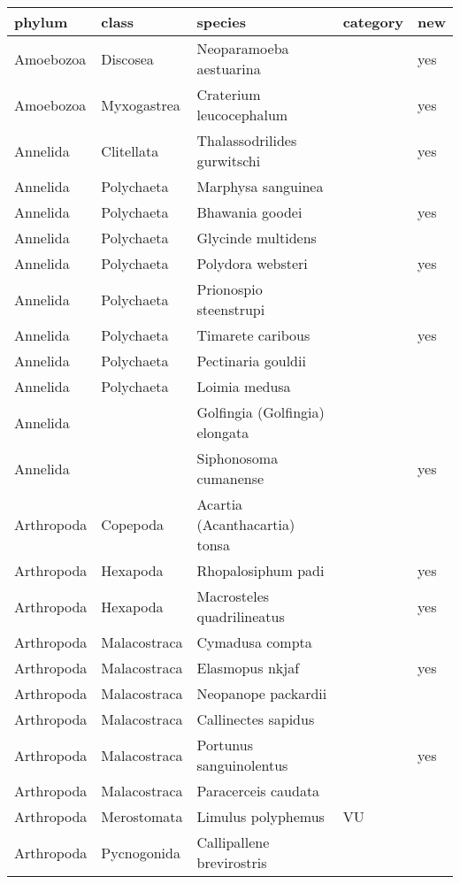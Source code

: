 \begingroup\fontsize{9pt}{10pt}\selectfont
\begin{longtable}{lllll}
  \hline
phylum & class & species & category & new \\ 
  \hline
Amoebozoa & Discosea & Neoparamoeba aestuarina &  & yes \\ 
  Amoebozoa & Myxogastrea & Craterium leucocephalum &  & yes \\ 
  Annelida & Clitellata & Thalassodrilides gurwitschi &  & yes \\ 
  Annelida & Polychaeta & Marphysa sanguinea &  &  \\ 
  Annelida & Polychaeta & Bhawania goodei &  & yes \\ 
  Annelida & Polychaeta & Glycinde multidens &  &  \\ 
  Annelida & Polychaeta & Polydora websteri &  & yes \\ 
  Annelida & Polychaeta & Prionospio steenstrupi &  &  \\ 
  Annelida & Polychaeta & Timarete caribous &  & yes \\ 
  Annelida & Polychaeta & Pectinaria gouldii &  &  \\ 
  Annelida & Polychaeta & Loimia medusa &  &  \\ 
  Annelida &  & Golfingia (Golfingia) elongata &  &  \\ 
  Annelida &  & Siphonosoma cumanense &  & yes \\ 
  Arthropoda & Copepoda & Acartia (Acanthacartia) tonsa &  &  \\ 
  Arthropoda & Hexapoda & Rhopalosiphum padi &  & yes \\ 
  Arthropoda & Hexapoda & Macrosteles quadrilineatus &  & yes \\ 
  Arthropoda & Malacostraca & Cymadusa compta &  &  \\ 
  Arthropoda & Malacostraca & Elasmopus nkjaf &  & yes \\ 
  Arthropoda & Malacostraca & Neopanope packardii &  &  \\ 
  Arthropoda & Malacostraca & Callinectes sapidus &  &  \\ 
  Arthropoda & Malacostraca & Portunus sanguinolentus &  & yes \\ 
  Arthropoda & Malacostraca & Paracerceis caudata &  &  \\ 
  Arthropoda & Merostomata & Limulus polyphemus & VU &  \\ 
  Arthropoda & Pycnogonida & Callipallene brevirostris &  &  \\ 

\end{longtable}
